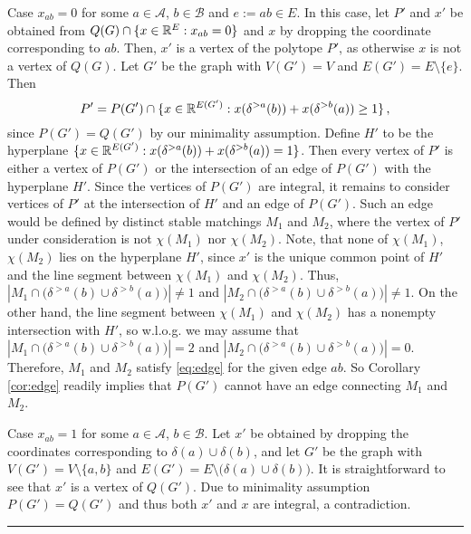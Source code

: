 \documentclass[3p,times]{elsarticle}
\newenvironment{proof}{{\bf Proof:  }}{\hfill\rule{2mm}{2mm}}
\begin{document}
\begin{proof}
Case $x_{ab}=0$ for some $a\in \mathcal{A}$, $b\in\mathcal{B}$ and
$e:=ab\in E$. In this case, let $P'$ and $x'$ be obtained from $Q(G)\cap\{x\in\mathbb{R}^E: x_{ab}=0\}$ and $x$ by dropping
the coordinate corresponding to $ab$. Then,
$x'$ is a vertex of the polytope $P'$, as otherwise $x$ is not a vertex of $Q(G)$.  Let $G'$ be the graph with
$V(G')=V$ and $E(G') = E \setminus \{e\}$. Then 
$$P' = P(G') \cap \{x\in \mathbb{R}^{E(G')}: x(\delta^{>a}(b))+ x(\delta^{>b}(a))\geq1\}\,,$$
since $P(G')=Q(G')$ by our minimality assumption. Define $H'$ to be the hyperplane $\{x\in \mathbb{R}^{E(G')}: x(\delta^{>a}(b))+ x(\delta^{>b}(a))=1\}$.  Then every vertex
of $P'$ is either a vertex of $P(G')$ or the intersection of an edge
of $P(G')$ with the hyperplane $H'$. Since the vertices of $P(G')$ are
integral, it remains to consider
vertices of $P'$ at the intersection of $H'$ and an edge of $P(G')$. Such an
edge would be defined by distinct stable matchings $M_1$ and $M_2$, where the vertex of $P'$ under consideration is not $\chi(M_1)$ nor $\chi(M_2)$. Note, that none of $\chi(M_1)$, $\chi(M_2)$ lies on the hyperplane $H'$, since $x'$ is the unique common point of $H'$ and the line segment between $\chi(M_1)$ and $\chi(M_2)$. Thus, $|M_1 \cap \big(\delta^{>a}(b)\cup\delta^{>b}(a)\big)|\neq 1$ and $|M_2 \cap \big(\delta^{>a}(b)\cup\delta^{>b}(a)\big)|\neq 1$. On the other hand, the line segment between $\chi(M_1)$ and $\chi(M_2)$ has a nonempty intersection with $H'$, so w.l.o.g. we may assume that $|M_1 \cap \big(\delta^{>a}(b)\cup\delta^{>b}(a)\big)|=2$ and $|M_2 \cap \big(\delta^{>a}(b)\cup\delta^{>b}(a)\big)|=0$. Therefore, $M_1$ and $M_2$ satisfy \eqref{eq:edge} for the given edge $ab$. So
Corollary \ref{cor:edge} readily implies that $P(G')$ cannot
have an edge connecting $M_1$ and $M_2$.

Case $x_{ab}=1$ for some $a\in \mathcal{A}$, $b\in\mathcal{B}$. Let
$x'$ be obtained by dropping the coordinates corresponding to
$\delta(a)\cup\delta(b)$, and let $G'$ be the graph with
$V(G')=V\setminus\{a,b\}$ and
$E(G') = E \setminus \big(\delta(a)\cup\delta(b)\big)$. It is
straightforward to see that $x'$ is a vertex of $Q(G')$. Due to minimality assumption $P(G')=Q(G')$ and thus both $x'$ and $x$ are integral, a contradiction.
\end{proof}




\end{document}

